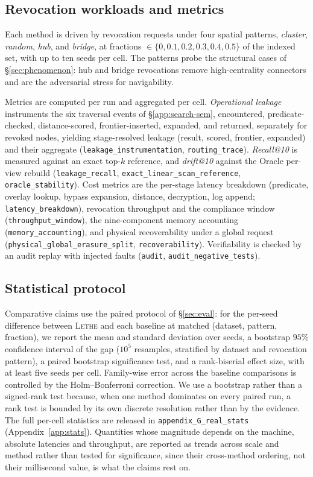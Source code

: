 \documentclass[sigconf, nonacm, review]{acmart}
\begin{document}
\subsection{Revocation workloads and metrics}
\label{app:repro-metrics}
Each method is driven by revocation requests under four spatial patterns, \emph{cluster}, \emph{random}, \emph{hub}, and \emph{bridge}, at fractions
$\in\{0,0.1,0.2,0.3,0.4,0.5\}$ of the indexed set, with up to ten seeds per
cell. The patterns probe the structural cases of \S\ref{sec:phenomenon}: hub
and bridge revocations remove high-centrality connectors and are the adversarial
stress for navigability.

Metrics are computed per run and aggregated per cell. \emph{Operational
leakage} instruments the six traversal events of \S\ref{app:search-sem}, encountered, predicate-checked, distance-scored, frontier-inserted, expanded,
and returned, separately for revoked nodes, yielding stage-resolved leakage
(result, scored, frontier, expanded) and their aggregate
(\texttt{leakage\_instrumentation}, \texttt{routing\_trace}). \emph{Recall@10}
is measured against an exact top-$k$ reference, and \emph{drift@10} against the
Oracle per-view rebuild (\texttt{leakage\_recall},
\texttt{exact\_linear\_scan\_reference}, \texttt{oracle\_stability}). Cost
metrics are the per-stage latency breakdown (predicate, overlay lookup, bypass
expansion, distance, decryption, log append; \texttt{latency\_breakdown}),
revocation throughput and the compliance window
(\texttt{throughput\_window}), the nine-component memory accounting
(\texttt{memory\_accounting}), and physical recoverability under a global
request (\texttt{physical\_global\_erasure\_split}, \texttt{recoverability}).
Verifiability is checked by an audit replay with injected faults
(\texttt{audit}, \texttt{audit\_negative\_tests}).

\subsection{Statistical protocol}
\label{app:repro-stats}
Comparative claims use the paired protocol of \S\ref{sec:eval}: for the
per-seed difference between \textsc{Lethe} and each baseline at matched
(dataset, pattern, fraction), we report the mean and standard deviation over
seeds, a bootstrap $95\%$ confidence interval of the gap ($10^5$ resamples,
stratified by dataset and revocation pattern), a paired bootstrap significance
test, and a rank-biserial effect size, with at least five seeds per cell.
Family-wise error across the baseline comparisons is controlled by the
Holm--Bonferroni correction. We use a bootstrap rather than a signed-rank test
because, when one method dominates on every paired run, a rank test is bounded
by its own discrete resolution rather than by the evidence. The full per-cell
statistics are released in \texttt{appendix\_G\_real\_stats}
(Appendix~\ref{app:stats}). Quantities
whose magnitude depends on the machine, absolute latencies and throughput, are reported as trends across scale and method rather than tested for
significance, since their cross-method ordering, not their millisecond value, is
what the claims rest on.
\end{document}
